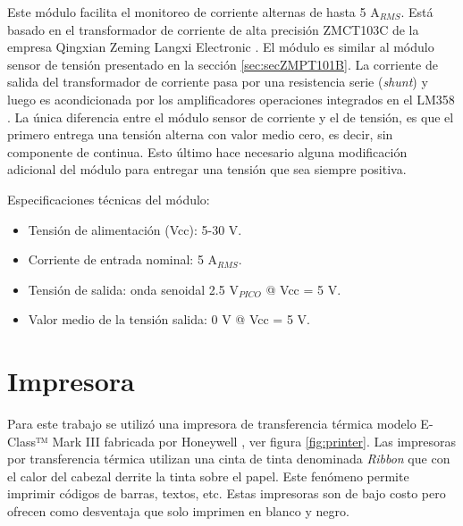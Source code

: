 Este módulo facilita el monitoreo de corriente alternas de hasta 5 A$_{RMS}$. Está basado en el transformador de corriente de alta precisión ZMCT103C de la empresa Qingxian Zeming Langxi Electronic \citep{ZMCT103C_b}. El módulo es similar al módulo sensor de tensión presentado en la sección \ref{sec:secZMPT101B}. La corriente de salida del transformador de corriente pasa por una resistencia serie (\textit{shunt}) y luego es acondicionada por los amplificadores operaciones integrados en el LM358 \citep{LM358}. La única diferencia entre el módulo sensor de corriente y el de tensión, es que el primero entrega una tensión alterna con valor medio cero, es decir, sin componente de continua. Esto último hace necesario alguna modificación adicional del módulo para entregar una tensión que sea siempre positiva.

Especificaciones técnicas del módulo: 
\begin{itemize}
\item Tensión de alimentación (Vcc): 5-30 V.
\item Corriente de entrada nominal: 5 A$_{RMS}$.
\item Tensión de salida: onda senoidal 2.5 V$_{PICO}$ @ Vcc = 5 V.
\item Valor medio de la tensión salida: 0 V @ Vcc = 5 V.
\end{itemize}

\section{Impresora}
\label{sec:Impre}
Para este trabajo se utilizó una impresora de transferencia térmica modelo E-Class™ Mark III fabricada por Honeywell \citep{printer_b}, ver figura \ref{fig:printer}. Las impresoras por transferencia térmica utilizan una cinta de tinta denominada \textit{Ribbon} que con el calor del cabezal derrite la tinta sobre el papel. Este fenómeno permite imprimir códigos de barras, textos, etc. Estas impresoras son de bajo costo pero ofrecen como desventaja que solo imprimen en blanco y negro.

